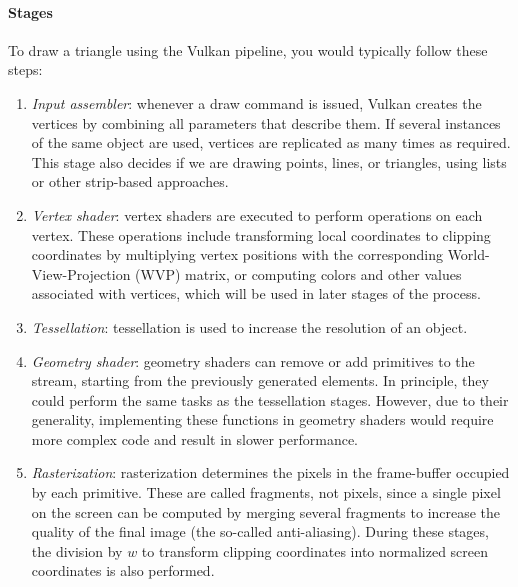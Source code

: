 \paragraph*{Stages}
To draw a triangle using the Vulkan pipeline, you would typically follow these steps:
\begin{enumerate}
    \item \textit{Input assembler}: whenever a draw command is issued, Vulkan creates the vertices by combining all parameters that describe them. 
        If several instances of the same object are used, vertices are replicated as many times as required.
        This stage also decides if we are drawing points, lines, or triangles, using lists or other strip-based approaches.
    \item \textit{Vertex shader}: vertex shaders are executed to perform operations on each vertex. 
        These operations include transforming local coordinates to clipping coordinates by multiplying vertex positions with the corresponding World-View-Projection (WVP) matrix, or computing colors and other values associated with vertices, which will be used in later stages of the process.
    \item \textit{Tessellation}: tessellation is used to increase the resolution of an object. 
    \item \textit{Geometry shader}: geometry shaders can remove or add primitives to the stream, starting from the previously generated elements. 
        In principle, they could perform the same tasks as the tessellation stages. 
        However, due to their generality, implementing these functions in geometry shaders would require more complex code and result in slower performance.
    \item \textit{Rasterization}: rasterization determines the pixels in the frame-buffer occupied by each primitive. 
        These are called fragments, not pixels, since a single pixel on the screen can be computed by merging several fragments to increase the quality of the final image (the so-called anti-aliasing). 
        During these stages, the division by $w$ to transform clipping coordinates into normalized screen coordinates is also performed. 
        

\end{enumerate}
